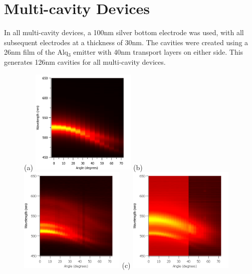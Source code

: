\documentclass{report}
\begin{document}
    \section{Multi-cavity Devices} \label{n>1}
        In all multi-cavity devices, a 100nm silver bottom electrode was used, with all subsequent electrodes at a thickness of 30nm. The cavities were created using a 26nm film of the Alq$_3$ emitter with 40nm transport layers on either side. This generates 126nm cavities for all multi-cavity devices.
		\begin{figure}[h!]
            \centering
            (a)
            \includegraphics[width=0.45\textwidth]{images/n2_heatmap.png}
            (b)
            \includegraphics[width=0.45\textwidth]{images/n3_heatmap.png}
            \newline
            (c)
            \includegraphics[width=0.45\textwidth]{images/n4_heatmap.png}

\end{figure}
\end{document}
